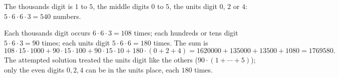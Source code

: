The thousands digit is $1$ to $5$, the middle digits $0$ to $5$, the units digit $0$, $2$ or $4$: $5\cdot6\cdot6\cdot3=540$ numbers.

Each thousands digit occurs $6\cdot6\cdot3=108$ times; each hundreds or tens digit $5\cdot6\cdot3=90$ times; each units digit $5\cdot6\cdot6=180$ times. The sum is
\[108\cdot15\cdot1000+90\cdot15\cdot100+90\cdot15\cdot10+180\cdot(0+2+4)=1620000+135000+13500+1080=\boxed{1769580}.\]
The attempted solution treated the units digit like the others ($90\cdot(1+\cdots+5)$); only the even digits $0,2,4$ can be in the units place, each $180$ times.
